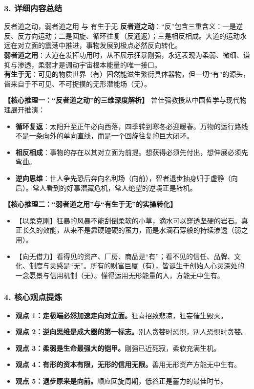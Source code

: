 \subsubsection{3. 详细内容总结}

\begin{ConceptBox}{反者道之动，弱者道之用 与 有生于无}
\textbf{反者道之动}：“反”包含三重含义：一是逆反、反方向运动；二是回旋、循环往复（反通返）；三是相反相成。大道的运动永远在对立面的震荡中推进，事物发展到极点必然反向转化。\\
\textbf{弱者道之用}：大道在发挥功用时，从不展示狂暴刚强，永远表现为柔弱、微细、谦抑与渗透，柔弱才是调动宇宙根本能量的唯一接口。\\
\textbf{有生于无}：可见的物质世界（有）固然能滋生繁衍具体器物，但一切“有”的源头，皆来自于不可见、不可捉摸的无形潜能场（无）。
\end{ConceptBox}

\noindent\textbf{【核心推理一：“反者道之动”的三维深度解析】}
曾仕强教授从中国哲学与现代物理展开推演：
\begin{itemize}
    \item \textbf{循环复返}：太阳升至正午必向西落，四季转到寒冬必迎暖春。万物的运行路线不是一条向外的单向直线，而是一个回旋往复的巨大闭环。
    \item \textbf{相反相成}：事物的存在以其对立面为前提。想获得必须先付出，想伸展必须先弯曲。
    \item \textbf{逆向思维}：世人争先恐后奔向名利场（向前），智者退步抽身归于虚静（向后）。常人看到的好事潜藏危机，常人绝望的逆境正是转机。
\end{itemize}

\noindent\textbf{【核心推理二：“弱者道之用”与“有生于无”的实操转化】}
\begin{itemize}
    \item 【以柔克刚】狂暴的风暴不能刮倒柔软的小草，滴水可以穿透坚硬的岩石。真正长久的效能，从来不是靠硬碰硬的蛮力，而是水滴石穿般的持续渗透（弱之用）。
    \item 【向无借力】看得见的资产、厂房、商品是“有”；看不见的信任、品牌、文化、制度与灵感是“无”。所有的财富巨厦（有），皆诞生于创始人心灵深处的一念愿景与信用机制（无）。懂得运用无形能量的人，方能无中生有。
\end{itemize}

\subsubsection{4. 核心观点提炼}
\begin{itemize}
    \item \textbf{观点 1：走极端必然加速走向对立面。}狂喜招致悲凉，狂妄催生毁灭。
    \item \textbf{观点 2：逆向思维是成大器的第一标志。}别人贪婪时恐惧，别人恐惧时贪婪。
    \item \textbf{观点 3：柔弱是生命最强大的铠甲。}刚强已近死寂，柔软充满生机。
    \item \textbf{观点 4：有形的资本有限，无形的信用无限。}善用无形资产方能无中生有。
    \item \textbf{观点 5：退步原来是向前。}顺应回旋周期，低谷正是蓄力的最佳时节。
\end{itemize}

